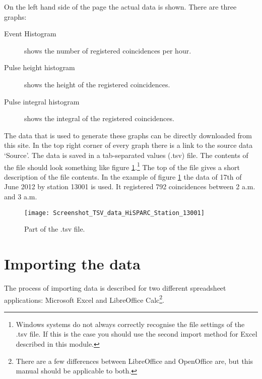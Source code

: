 On the left hand side of the page the actual data is shown. There are three graphs:
\begin{description}
\item[Event Histogram] shows the number of registered coincidences per hour.
\item[Pulse height histogram] shows the height of the registered coincidences.
\item[Pulse integral histogram] shows the integral of the registered coincidences.
\end{description}

The data that is used to generate these graphs can be directly downloaded from this site. In the top right corner of every graph there is a link to the source data `Source'. The data is saved in a tab-separated values (.tsv) file. The contents of the file should look something like figure \ref{fig:data_TSV}.\footnote{Windows systems do not always correctly recognise the file settings of the .tsv file. If this is the case you should use the second import method for Excel described in this module.} The top of the file gives a short description of the file contents. In the example of figure \ref{fig:data_TSV} the data of 17th of June 2012 by station 13001 is used. It registered 792 coincidences between 2 a.m. and 3 a.m.

\begin{figure}\begin{center}
\texttt{[image: Screenshot\_TSV\_data\_HiSPARC\_Station\_13001]}
\caption{Part of the .tsv file.}\label{fig:data_TSV}
\end{center}\end{figure}

\section{Importing the data}
The process of importing data is described for two different spreadsheet applications: Microsoft Excel and LibreOffice Calc\footnote{There are a few differences between LibreOffice and OpenOffice are, but this manual should be applicable to both.}.

